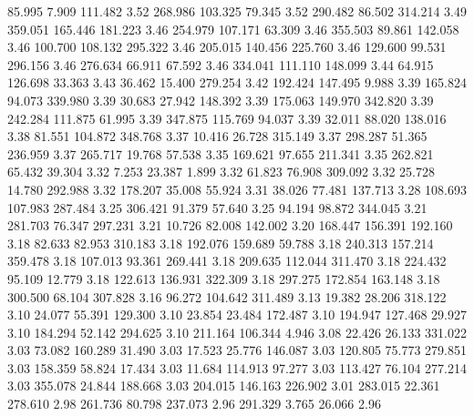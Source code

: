   85.995    7.909  111.482         3.52
 268.986  103.325   79.345         3.52
 290.482   86.502  314.214         3.49
 359.051  165.446  181.223         3.46
 254.979  107.171   63.309         3.46
 355.503   89.861  142.058         3.46
 100.700  108.132  295.322         3.46
 205.015  140.456  225.760         3.46
 129.600   99.531  296.156         3.46
 276.634   66.911   67.592         3.46
 334.041  111.110  148.099         3.44
  64.915  126.698   33.363         3.43
  36.462   15.400  279.254         3.42
 192.424  147.495    9.988         3.39
 165.824   94.073  339.980         3.39
  30.683   27.942  148.392         3.39
 175.063  149.970  342.820         3.39
 242.284  111.875   61.995         3.39
 347.875  115.769   94.037         3.39
  32.011   88.020  138.016         3.38
  81.551  104.872  348.768         3.37
  10.416   26.728  315.149         3.37
 298.287   51.365  236.959         3.37
 265.717   19.768   57.538         3.35
 169.621   97.655  211.341         3.35
 262.821   65.432   39.304         3.32
   7.253   23.387    1.899         3.32
  61.823   76.908  309.092         3.32
  25.728   14.780  292.988         3.32
 178.207   35.008   55.924         3.31
  38.026   77.481  137.713         3.28
 108.693  107.983  287.484         3.25
 306.421   91.379   57.640         3.25
  94.194   98.872  344.045         3.21
 281.703   76.347  297.231         3.21
  10.726   82.008  142.002         3.20
 168.447  156.391  192.160         3.18
  82.633   82.953  310.183         3.18
 192.076  159.689   59.788         3.18
 240.313  157.214  359.478         3.18
 107.013   93.361  269.441         3.18
 209.635  112.044  311.470         3.18
 224.432   95.109   12.779         3.18
 122.613  136.931  322.309         3.18
 297.275  172.854  163.148         3.18
 300.500   68.104  307.828         3.16
  96.272  104.642  311.489         3.13
  19.382   28.206  318.122         3.10
  24.077   55.391  129.300         3.10
  23.854   23.484  172.487         3.10
 194.947  127.468   29.927         3.10
 184.294   52.142  294.625         3.10
 211.164  106.344    4.946         3.08
  22.426   26.133  331.022         3.03
  73.082  160.289   31.490         3.03
  17.523   25.776  146.087         3.03
 120.805   75.773  279.851         3.03
 158.359   58.824   17.434         3.03
  11.684  114.913   97.277         3.03
 113.427   76.104  277.214         3.03
 355.078   24.844  188.668         3.03
 204.015  146.163  226.902         3.01
 283.015   22.361  278.610         2.98
 261.736   80.798  237.073         2.96
 291.329    3.765   26.066         2.96
